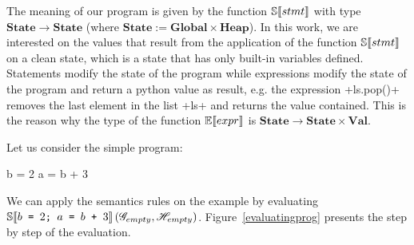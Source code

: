 The meaning of our program is given by the function $\mathbb{S}\!\left\llbracket stmt \right\rrbracket$ with type
$\mathbf{State} \to \mathbf{State}$ (where $\mathbf{State} := \mathbf{Global} \times \mathbf{Heap}$).
In this work, we are interested on the values that result from the application of the
function $\mathbb{S}\!\left\llbracket stmt \right\rrbracket$ on a clean state, which is a state that has only built-in variables
defined.  Statements modify the state of the program while expressions modify the state of
the program and return a python value as result, e.g. the expression \pycode+ls.pop()+
removes the last element in the list \pycode+ls+ and returns the value contained. This is
the reason why the type of the function $\mathbb{E}\!\left\llbracket expr \right\rrbracket$ is
$\mathbf{State} \to \mathbf{State} \times \mathbf{Val}$.

Let us consider the simple program:

\begin{pythoncode}
b = 2
a = b + 3
\end{pythoncode}

We can apply the semantics rules on the example by evaluating
$\mathbb{S}\!\left\llbracket b \texttt{ = } 2\texttt{; } a \texttt{ = } b \texttt{ + } 3 \right\rrbracket\left(\mathscr{G}_{empty}, \mathscr{H}_{empty}\right)$.
Figure~\ref{evaluatingprog} presents the step by step of the evaluation.


